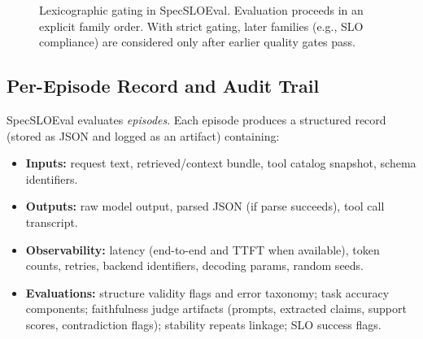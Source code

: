 \documentclass[11pt]{article}
\begin{document}
\begin{figure}[t]
\centering
{}
\caption{Lexicographic gating in SpecSLOEval.
Evaluation proceeds in an explicit family order.
With strict gating, later families (e.g., SLO compliance) are considered only after earlier quality gates pass.}
\label{fig:criteria-gating}
\end{figure}

\subsection{Per-Episode Record and Audit Trail}
\label{sec:episode-record}

SpecSLOEval evaluates \emph{episodes}. Each episode produces a structured record (stored as JSON and logged as an artifact) containing:

\begin{itemize}[leftmargin=12pt]
    \item \textbf{Inputs:} request text, retrieved/context bundle, tool catalog snapshot, schema identifiers.
    \item \textbf{Outputs:} raw model output, parsed JSON (if parse succeeds), tool call transcript.
    \item \textbf{Observability:} latency (end-to-end and TTFT when available), token counts, retries, backend identifiers, decoding params, random seeds.
    \item \textbf{Evaluations:} structure validity flags and error taxonomy; task accuracy components; faithfulness judge artifacts (prompts, extracted claims, support scores, contradiction flags); stability repeats linkage; SLO success flags.
\end{itemize}
\end{document}
